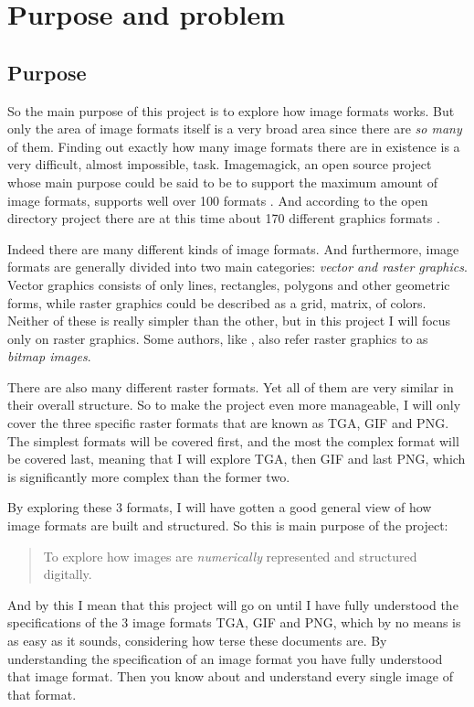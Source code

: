 \begin{comment}
  
\end{comment}

\chapter{Purpose and problem}

\section{Purpose}

So the main purpose of this project is to explore how image formats
works. But only the area of image formats itself is a very broad area
since there are \textit{so many} of them. Finding out exactly how
many image formats there are in existence is a very difficult, almost
impossible, task. Imagemagick, an open source project whose main purpose
could be said to be to support the maximum amount of image formats,
supports well over 100 formats \cite{11:imagemagick_home}. And
according to the open directory project there are at this time about
170 different graphics formats \cite{10:opendirectory_data_formats}.

Indeed there are many different kinds of image formats. And
furthermore, image formats are generally divided into two main
categories: \textit{vector and raster
  graphics}\cite{murray1996encyclopedia,roelofs99:_png}. Vector
graphics consists of only lines, rectangles, polygons and other
geometric forms, while raster graphics could be described as a grid,
matrix, of colors. Neither of these is really simpler than the other,
but in this project I will focus only on raster graphics. Some
authors, like \cite{murray1996encyclopedia}, also refer raster
graphics to as \textit{bitmap images}.

There are also many different raster formats. Yet all of them are very
similar in their overall structure. So to make the project even more
manageable, I will only cover the three specific raster formats that
are known as TGA, GIF and PNG. The simplest formats will be covered
first, and the most the complex format will be covered last, meaning
that I will explore TGA, then GIF and last PNG, which is significantly
more complex than the former two.

By exploring these 3 formats, I will have gotten a good general view
of how image formats are built and structured. So this is main purpose
of the project:

\begin{quote}
  To explore how images are \textit{numerically} represented and
  structured digitally.
\end{quote}

And by this I mean that this project will go on until I have fully
understood the specifications of the 3 image formats TGA, GIF and PNG,
which by no means is as easy as it sounds, considering how terse these
documents are. By understanding the specification of an image format
you have fully understood that image format. Then you know about and
understand every single image of that format.
